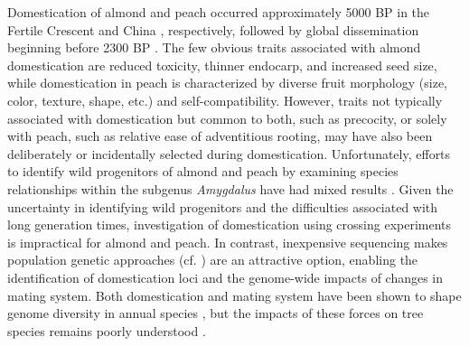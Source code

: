 \documentclass[12pt]{article}
\begin{document}
Domestication of almond and peach occurred approximately 5000 BP in the Fertile Crescent and China \citep{zohary2012domestication}, respectively, followed by global dissemination beginning before 2300 BP \citep{hedrick1917peaches, edwards1975almond, gradziel2011origin, zheng2014archaeological}. 
%
The few obvious traits associated with almond domestication are reduced toxicity, thinner endocarp, and increased seed size, while domestication in peach is characterized by diverse fruit morphology (size, color, texture, shape, etc.) and self-compatibility.
%
However, traits not typically associated with domestication but common to both, such as precocity, or solely with peach, such as relative ease of adventitious rooting, may have also been deliberately or incidentally selected during domestication. 
%
Unfortunately, efforts to identify wild progenitors of almond and peach by examining species relationships within the subgenus \emph{Amygdalus} have had mixed results \citep{mowrey1990isozyme, browicz1996genus, ladizinsky1999origin, aradhya2004molecular, bassi20081, zeinalabedini2010origin, verde2013high}. 
%
Given the uncertainty in identifying wild progenitors and the difficulties associated with long generation times, investigation of domestication using crossing experiments is impractical for almond and peach.
%
In contrast, inexpensive sequencing makes population genetic approaches (cf. \citealp{ross2007plant}) are an attractive option, enabling the identification of domestication loci and the genome-wide impacts of changes in mating system.   
%
Both domestication and mating system have been shown to shape genome diversity in annual species \citep{glemin2006impact, doebley2006molecular, slotte2013capsella}, but the impacts of these forces on tree species remains poorly understood \citep{mckey2010evolutionary, miller2011forest}.
\end{document}
